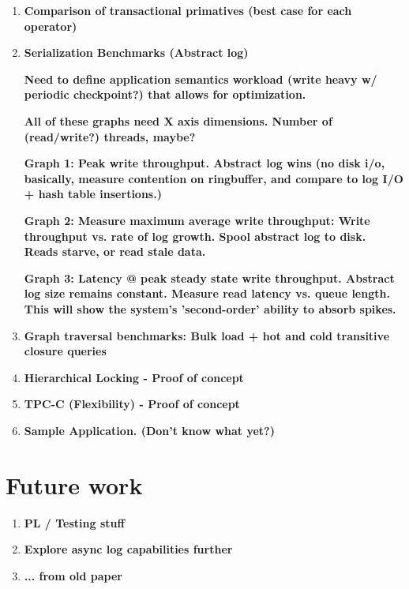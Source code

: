 \documentclass[letterpaper,english]{article}
\begin{document}
\begin{enumerate}

  \item {\bf Comparison of transactional primatives (best case for each operator)}

  \item {\bf Serialization Benchmarks (Abstract log) }

    {\bf Need to define application semantics workload (write heavy w/ periodic checkpoint?) that allows for optimization.}
    
    {\bf All of these graphs need X axis dimensions.  Number of (read/write?) threads, maybe?}
 
    {\bf Graph 1:  Peak write throughput. Abstract log wins (no disk i/o, basically, measure contention on ringbuffer, and compare to log I/O + hash table insertions.)}

    {\bf Graph 2:  Measure maximum average write throughput: Write throughput vs. rate of log growth.  Spool abstract log to disk.
              Reads starve, or read stale data. }

    {\bf Graph 3:  Latency @ peak steady state write throughput.  Abstract log size remains constant.  Measure read latency vs.
               queue length.  This will show the system's 'second-order' ability to absorb spikes. }

  \item {\bf Graph traversal benchmarks:  Bulk load + hot and cold transitive closure queries}

  \item {\bf Hierarchical Locking - Proof of concept}

  \item {\bf TPC-C (Flexibility) - Proof of concept}
    

  \item {\bf Sample Application. (Don't know what yet?) }

\end{enumerate}

\section{Future work}
\begin{enumerate}
  \item {\bf PL / Testing stuff}
  \item {\bf Explore async log capabilities further}
  \item {\bf ... from old paper}
\end{enumerate}
\end{document}

